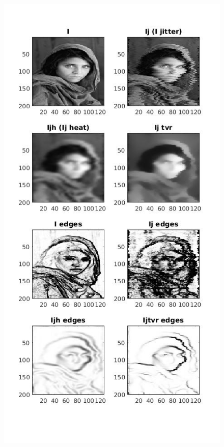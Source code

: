 \documentclass[12pt]{article}
\begin{document}
\begin{figure}[ht!]
\centering
\includegraphics[scale=0.7]{three}
\end{figure}



\end{document}
